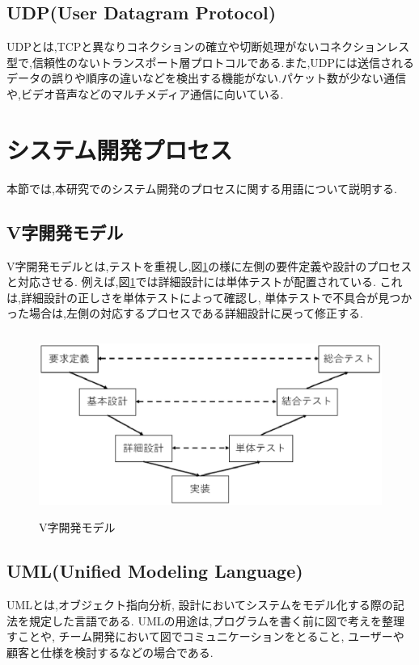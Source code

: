 \subsection{UDP(User Datagram Protocol)}
UDPとは,TCPと異なりコネクションの確立や切断処理がないコネクションレス型で,信頼性のないトランスポート層プロトコルである\cite{tcp/udp}.また,UDPには送信されるデータの誤りや順序の違いなどを検出する機能がない.パケット数が少ない通信や,ビデオ音声などのマルチメディア通信に向いている.

\section{システム開発プロセス}
本節では,本研究でのシステム開発のプロセスに関する用語について説明する.
\subsection{V字開発モデル}
V字開発モデルとは,テストを重視し,図\ref{fig:vmodel}の様に左側の要件定義や設計のプロセスと対応させる.
例えば,図\ref{fig:vmodel}では詳細設計には単体テストが配置されている.
これは,詳細設計の正しさを単体テストによって確認し,
単体テストで不具合が見つかった場合は,左側の対応するプロセスである詳細設計に戻って修正する\cite{vmodel}.

\begin{figure}[H]
\begin{center}
	\includegraphics[height=60mm]{vmodel.eps}
	\caption{V字開発モデル}
        \label{fig:vmodel}
\end{center}
\end{figure}

\subsection{UML(Unified Modeling Language)}
UMLとは,オブジェクト指向分析,
設計においてシステムをモデル化する際の記法を規定した言語である.
UMLの用途は,プログラムを書く前に図で考えを整理すことや,
チーム開発において図でコミュニケーションをとること,
ユーザーや顧客と仕様を検討するなどの場合である\cite{uml}.

